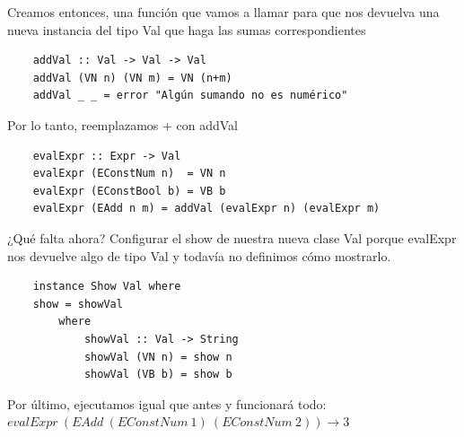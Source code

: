 \documentclass[10pt,a4paper]{article}
\begin{document}
Creamos entonces, una función que vamos a llamar para que nos devuelva una nueva instancia del tipo Val que haga las sumas correspondientes
\begin{lstlisting}
    addVal :: Val -> Val -> Val 
    addVal (VN n) (VN m) = VN (n+m)
    addVal _ _ = error "Algún sumando no es numérico"
\end{lstlisting}
Por lo tanto, reemplazamos + con addVal 
\begin{lstlisting}
    evalExpr :: Expr -> Val
    evalExpr (EConstNum n)  = VN n
    evalExpr (EConstBool b) = VB b
    evalExpr (EAdd n m) = addVal (evalExpr n) (evalExpr m)
\end{lstlisting}
¿Qué falta ahora? Configurar el show de nuestra nueva clase Val porque evalExpr nos devuelve algo de tipo Val y todavía no definimos cómo mostrarlo. 
\begin{lstlisting}
    instance Show Val where 
    show = showVal 
        where 
            showVal :: Val -> String 
            showVal (VN n) = show n
            showVal (VB b) = show b
\end{lstlisting}
Por último, ejecutamos igual que antes y funcionará todo: $evalExpr \ (EAdd \ (EConstNum \ 1) \ (EConstNum \ 2)) \rightarrow 3$
\end{document}

